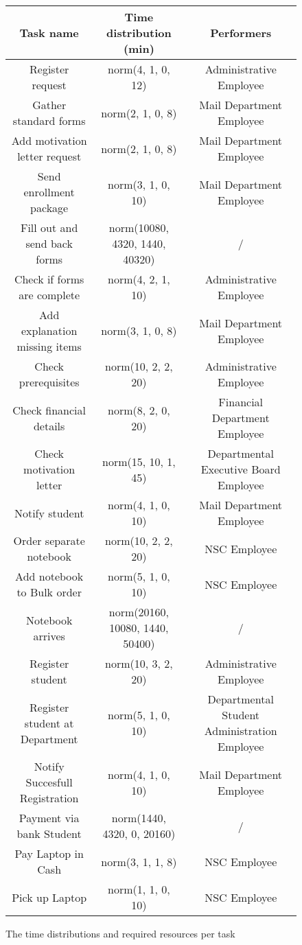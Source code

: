 \begin{figure}[h!]
	\centering
	\begin{tabular}{ | c | c | c | }
		\hline
		\textbf{Task name} & \textbf{Time distribution (min)} & \textbf{Performers}\\ \hline\hline
		Register request & norm(4, 1, 0, 12) & Administrative Employee \\ \hline
		Gather standard forms & norm(2, 1, 0, 8) & Mail Department Employee \\ \hline
		Add motivation letter request & norm(2, 1, 0, 8) & Mail Department Employee \\ \hline
		Send enrollment package & norm(3, 1, 0, 10) & Mail Department Employee \\ \hline
		Fill out and send back forms & norm(10080, 4320, 1440, 40320) & / \\ \hline
		Check if forms are complete & norm(4, 2, 1, 10) & Administrative Employee \\ \hline
		Add explanation missing items & norm(3, 1, 0, 8) & Mail Department Employee \\ \hline	
		Check prerequisites & norm(10, 2, 2, 20) & Administrative Employee \\ \hline
		Check financial details & norm(8, 2, 0, 20) & Financial Department Employee \\ \hline
		Check motivation letter & norm(15, 10, 1, 45) & Departmental Executive Board Employee \\ \hline
		Notify student & norm(4, 1, 0, 10) & Mail Department Employee \\ \hline
		Order separate notebook & norm(10, 2, 2, 20) & NSC Employee \\ \hline
		Add notebook to Bulk order & norm(5, 1, 0, 10) & NSC Employee \\ \hline
		Notebook arrives & norm(20160, 10080, 1440, 50400) & / \\ \hline
		Register student & norm(10, 3, 2, 20) & 
		Administrative Employee \\ \hline
		Register student at Department & norm(5, 1, 0, 10) & Departmental Student Administration Employee \\ \hline
		Notify Succesfull Registration & norm(4, 1, 0, 10) & Mail Department Employee \\ \hline
		Payment via bank Student & norm(1440, 4320, 0, 20160) & / \\ \hline
		Pay Laptop in Cash & norm(3, 1, 1, 8) & NSC Employee \\ \hline
		Pick up Laptop & norm(1, 1, 0, 10) & NSC Employee \\
		\hline
	\end{tabular}
	\caption{The time distributions and required resources per task}
	\label{fig:tasktimes1}
\end{figure}
	
